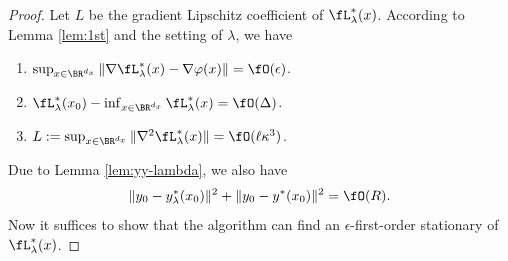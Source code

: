 \thmFBA* 
\begin{proof}
Let $L$ be the gradient Lipschitz coefficient of $\fL_{\lambda}^*(x)$.
According to Lemma \ref{lem:1st} and the setting of $\lambda$, we have
\begin{enumerate}[label=\alph*.]
    \item $\sup_{x \in \BR^{d_x}} \Vert \nabla \fL_{\lambda}^*(x) - \nabla \varphi(x) \Vert = \fO(\epsilon)$. 
    \item $\fL_{\lambda}^*(x_0) - \inf_{x \in \BR^{d_x}}  \fL_{\lambda}^*(x) = \fO(\Delta)$.
    \item $ L:=\sup_{x \in \BR^{d_x}}\Vert \nabla^2 \fL_{\lambda}^*(x) \Vert = \fO(\ell \kappa^3)$.
\end{enumerate}
Due to Lemma \ref{lem:yy-lambda}, we also have
\begin{align*}
    \Vert y_0 - y_{\lambda}^*(x_0) \Vert^2 + \Vert y_0 - y^*(x_0) \Vert^2 =\fO(R). 
\end{align*}
Now it suffices to show that the algorithm can find an $\epsilon$-first-order stationary of $\fL_{\lambda}^*(x)$. 


\end{proof}
